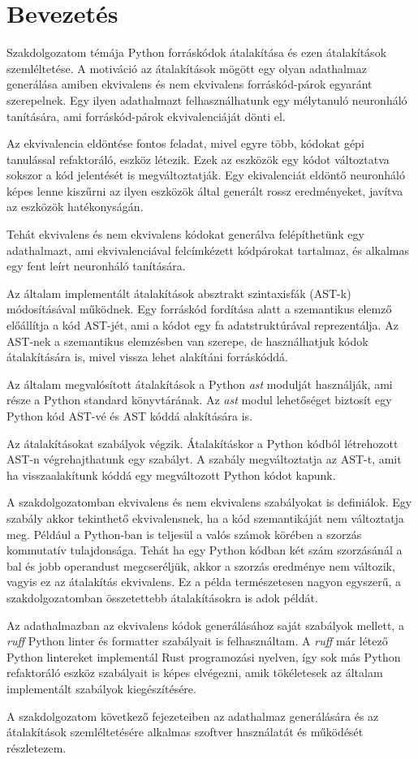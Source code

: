 \chapter{Bevezetés}
\label{ch:intro}

Szakdolgozatom témája Python forráskódok átalakítása és ezen átalakítások szemléltetése.
A motiváció az átalakítások mögött egy olyan adathalmaz generálása amiben ekvivalens és nem ekvivalens 
forráskód-párok egyaránt szerepelnek. Egy ilyen adathalmazt felhasználhatunk egy mélytanuló neuronháló tanítására,
ami forráskód-párok ekvivalenciáját dönti el.

Az ekvivalencia eldöntése fontos feladat, mivel egyre több, kódokat gépi tanulással refaktoráló, eszköz létezik.
Ezek az eszközök egy kódot változtatva sokszor a kód jelentését is megváltoztatják.
Egy ekivalenciát eldöntő neuronháló képes lenne kiszűrni az ilyen eszközök által generált
rossz eredményeket, javítva az eszközök hatékonyságán.

Tehát ekvivalens és nem ekvivalens kódokat generálva felépíthetünk egy adathalmazt, ami
ekvivalenciával felcímkézett kódpárokat tartalmaz, és alkalmas egy fent leírt neuronháló tanítására.

Az általam implementált átalakítások absztrakt szintaxisfák (AST-k) módosításával működnek.
Egy forráskód fordítása alatt a szemantikus elemző előállítja a kód AST-jét,
ami a kódot egy fa adatstruktúrával reprezentálja.
Az AST-nek a szemantikus elemzésben van szerepe,
de használhatjuk kódok átalakítására is, mivel vissza lehet alakítáni forráskóddá.

Az általam megvalósított átalakítások a Python \emph{ast} modulját használják,
ami része a Python standard könyvtárának.
Az \emph{ast} modul lehetőséget biztosít egy Python kód AST-vé és AST kóddá alakítására is.

Az átalakításokat szabályok végzik. Átalakításkor 
a Python kódból létrehozott AST-n végrehajthatunk egy szabályt.
A szabály megváltoztatja az AST-t, amit ha visszaalakítunk kóddá
egy megváltozott Python kódot kapunk.

A szakdolgozatomban ekvivalens és nem ekvivalens szabályokat is definiálok.
Egy szabály akkor tekinthető ekvivalensnek, ha a kód szemantikáját nem változtatja meg.
Például a Python-ban is teljesül a valós számok körében a szorzás kommutatív tulajdonsága.
Tehát ha egy Python kódban két szám szorzásánál a bal és jobb operandust megcseréljük,
akkor a szorzás eredménye nem változik, vagyis ez az átalakítás ekvivalens.
Ez a példa természetesen nagyon egyszerű, a szakdolgozatomban összetettebb átalakításokra is adok példát.

Az adathalmazban az ekvivalens kódok generálásához saját szabályok mellett,
a \emph{ruff} Python linter és formatter szabályait is felhasználtam.
A \emph{ruff} már létező Python lintereket implementál Rust programozási nyelven,
így sok más Python refaktoráló eszköz szabályait is képes elvégezni,
amik tökéletesek az általam implementált szabályok kiegészítésére.

A szakdolgozatom következő fejezeteiben az adathalmaz generálására és az átalakítások szemléltetésére 
alkalmas szoftver használatát és működését részletezem.
